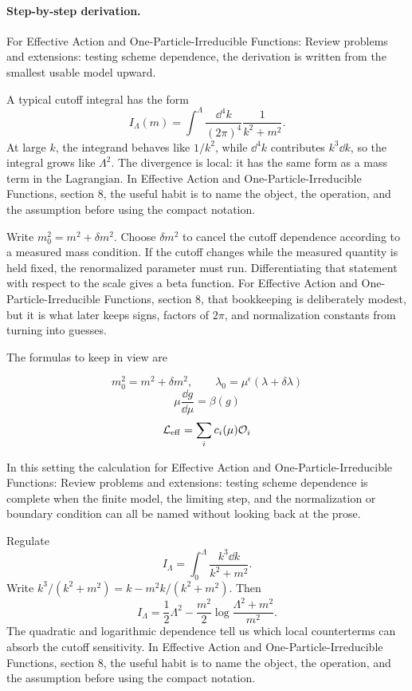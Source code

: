 \paragraph{Step-by-step derivation.}

For Effective Action and One-Particle-Irreducible Functions: Review problems and extensions: testing scheme dependence, the derivation is written from the smallest usable model upward.

A typical cutoff integral has the form
\[
  I_\Lambda(m)=\int^{\Lambda}\frac{\dd^4k}{(2\pi)^4}\frac{1}{k^2+m^2}.
\]
At large \(k\), the integrand behaves like \(1/k^2\), while \(\dd^4k\) contributes \(k^3\dd k\), so the integral grows like \(\Lambda^2\).  The divergence is local: it has the same form as a mass term in the Lagrangian.  In Effective Action and One-Particle-Irreducible Functions, section 8, the useful habit is to name the object, the operation, and the assumption before using the compact notation.

Write \(m_0^2=m^2+\delta m^2\).  Choose \(\delta m^2\) to cancel the cutoff dependence according to a measured mass condition.  If the cutoff changes while the measured quantity is held fixed, the renormalized parameter must run.  Differentiating that statement with respect to the scale gives a beta function.  For Effective Action and One-Particle-Irreducible Functions, section 8, that bookkeeping is deliberately modest, but it is what later keeps signs, factors of \(2\pi\), and normalization constants from turning into guesses.

The formulas to keep in view are

\[
  m_0^2=m^2+\delta m^2,\qquad \lambda_0=\mu^\epsilon(\lambda+\delta\lambda)
\]
\[
  \mu\frac{\dd g}{\dd\mu}=\beta(g)
\]
\[
  \mathcal L_{\mathrm{eff}}=\sum_i c_i(\mu)\mathcal O_i
\]

In this setting the calculation for Effective Action and One-Particle-Irreducible Functions: Review problems and extensions: testing scheme dependence is complete when the finite model, the limiting step, and the normalization or boundary condition can all be named without looking back at the prose.




\begin{example}
Regulate
\[
  I_\Lambda=\int_0^\Lambda\frac{k^3\dd k}{k^2+m^2}.
\]
Write \(k^3/(k^2+m^2)=k-m^2k/(k^2+m^2)\).  Then
\[
  I_\Lambda=\frac12\Lambda^2-\frac{m^2}{2}\log\frac{\Lambda^2+m^2}{m^2}.
\]
The quadratic and logarithmic dependence tell us which local counterterms can absorb the cutoff sensitivity.  In Effective Action and One-Particle-Irreducible Functions, section 8, the useful habit is to name the object, the operation, and the assumption before using the compact notation.
\end{example}



